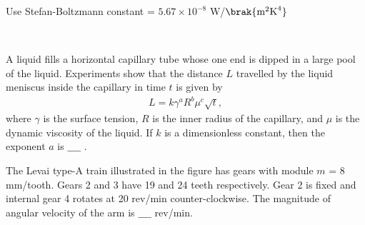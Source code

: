 Use Stefan-Boltzmann constant = $5.67 \times 10^{-8}$ W/$\brak{\text{m}^2\text{K}^4}$
\begin{figure}[!ht]
\centering
\resizebox{0.5\textwidth}{!}{%

}%
\end{figure}\\
\item A liquid fills a horizontal capillary tube whose one end is dipped in a large pool of the liquid. Experiments show that the distance $L$ travelled by the liquid meniscus inside the capillary in time $t$ is given by 
\begin{align*}
    L = k\gamma^aR^b\mu^c\sqrt{t},
\end{align*}
where $\gamma$ is the surface tension, $R$ is the inner radius of the capillary, and $\mu$ is the dynamic viscosity of the liquid. If $k$ is a dimensionless constant, then the exponent $a$ is $\_\_\_\_$ . \\
\item The Levai type-A train illustrated in the figure has gears with module
$m$ = 8 mm/tooth. Gears 2 and 3 have 19 and 24 teeth respectively. Gear 2 is
fixed and internal gear 4 rotates at 20 rev/min counter-clockwise. The magnitude of angular velocity of the arm is $\_\_\_\_$ rev/min. 
\begin{figure}[!ht]
\centering
\resizebox{0.5\textwidth}{!}{%

}%
\end{figure}\\
